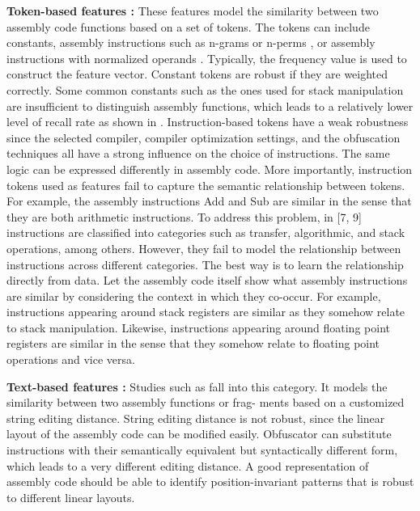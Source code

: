 \textbf{Token-based features :} These features model the similarity between two assembly code functions based on a set of tokens. The tokens can include constants, assembly instructions such as n-grams or n-perms \cite{Khoo}, or assembly instructions with normalized operands
\cite{Ding, Farhadi, Andreas}. Typically, the frequency value is used to construct the feature vector. Constant tokens are robust if they are weighted correctly. Some common constants such as the ones used for stack manipulation are insufficient to distinguish assembly functions, which leads to a relatively lower level of recall rate as shown in \cite{Khoo}. Instruction-based tokens have a weak robustness since the selected compiler, compiler optimization settings, and the obfuscation techniques all have a strong influence on the choice of instructions. The same logic can be expressed differently in assembly code. More importantly, instruction tokens used as features fail to capture the semantic relationship between tokens. For example, the assembly instructions Add and Sub are similar in the sense that they are both arithmetic instructions. To address this problem, in [7, 9] instructions are classified into categories such as transfer, algorithmic, and stack operations, among others. However, they fail to model the relationship between instructions across different categories. The best way is to learn the relationship directly from data. Let the assembly code itself show what assembly instructions are similar by considering the context in which they co-occur. For example, instructions appearing around stack registers are similar as they somehow relate to stack manipulation. Likewise, instructions appearing around floating point registers are similar in the sense that they somehow relate to floating point operations and vice versa.

\textbf{Text-based features :} Studies such as \cite{David} fall into this category. It models the similarity between two assembly functions or frag- ments based on a customized string editing distance. String editing distance is not robust, since the linear layout of the assembly code
can be modified  easily. Obfuscator can substitute instructions with their semantically equivalent but syntactically different form, which leads to a very different editing distance. A good representation of assembly code should be able to identify position-invariant patterns
that is robust to different linear layouts.

